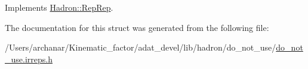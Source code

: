 Implements \mbox{\hyperlink{structHadron_1_1RepRep_ab3213025f6de249f7095892109575fde}{Hadron\+::\+Rep\+Rep}}.



The documentation for this struct was generated from the following file\+:\begin{DoxyCompactItemize}
\item 
/\+Users/archanar/\+Kinematic\+\_\+factor/adat\+\_\+devel/lib/hadron/do\+\_\+not\+\_\+use/\mbox{\hyperlink{do__not__use_8irreps_8h}{do\+\_\+not\+\_\+use.\+irreps.\+h}}\end{DoxyCompactItemize}
